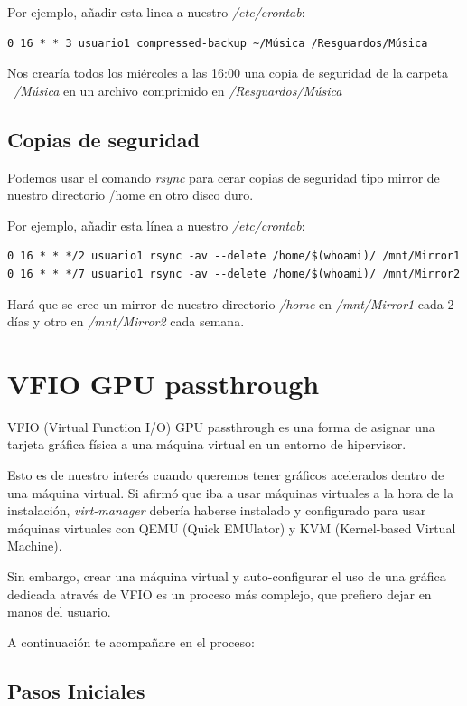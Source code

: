 \documentclass[12pt]{article}
\begin{document}
Por ejemplo, añadir esta linea a nuestro \emph{/etc/crontab}:

\begin{verbatim}
0 16 * * 3 usuario1 compressed-backup ~/Música /Resguardos/Música
\end{verbatim}

Nos crearía todos los miércoles a las 16:00 una copia de seguridad de la carpeta \emph{~/Música} en un archivo comprimido en \emph{/Resguardos/Música}

\subsection{Copias de seguridad}

Podemos usar el comando \emph{rsync} para cerar copias de seguridad tipo mirror de nuestro directorio /home en otro disco duro.

Por ejemplo, añadir esta línea a nuestro \emph{/etc/crontab}:

\begin{verbatim}
0 16 * * */2 usuario1 rsync -av --delete /home/$(whoami)/ /mnt/Mirror1
0 16 * * */7 usuario1 rsync -av --delete /home/$(whoami)/ /mnt/Mirror2
\end{verbatim}

Hará que se cree un mirror de nuestro directorio \emph{/home} en \emph{/mnt/Mirror1} cada 2 días y otro en \emph{/mnt/Mirror2} cada semana.

\section{VFIO GPU passthrough}

VFIO (Virtual Function I/O) GPU passthrough es una forma de asignar una tarjeta gráfica física a una máquina virtual en un entorno de hipervisor.

Esto es de nuestro interés cuando queremos tener gráficos acelerados dentro de una máquina virtual. Si afirmó que iba a usar máquinas virtuales a la hora de la instalación, \emph{virt-manager} debería haberse instalado y configurado para usar máquinas virtuales con QEMU (Quick EMUlator) y KVM (Kernel-based Virtual Machine).

Sin embargo, crear una máquina virtual y auto-configurar el uso de una gráfica dedicada através de VFIO es un proceso más complejo, que prefiero dejar en manos del usuario.

A continuación te acompañare en el proceso:

\subsection{Pasos Iniciales}
\end{document}
